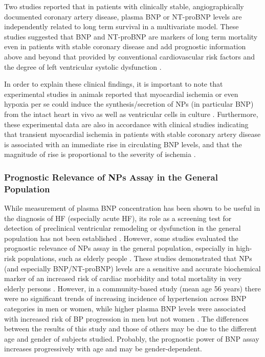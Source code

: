 \documentclass[14pt,a4paper,onecolumn]{extarticle}
\begin{document}
Two  studies reported that in patients with clinically stable, angiographically documented coronary artery disease, plasma BNP \citep{bib3241} or NT-proBNP \citep{bib3242} levels are independently related to long term survival in a multivariate model. These studies suggested that BNP and NT-proBNP are markers of long term mortality even in patients with stable coronary disease and add prognostic information above and beyond that provided by conventional cardiovascular risk factors and the degree of left ventricular systolic dysfunction \citep{bib3241} \citep{bib3242}.



In order to explain these clinical findings, it is important to note that experimental studies in animals reported that myocardial ischemia or even hypoxia per se could induce the synthesis/secretion of NPs (in particular BNP) from the intact heart in vivo as well as ventricular cells in culture \citep{bib3243} \citep{bib3244}. Furthermore, these experimental data are also in accordance with  clinical studies indicating that transient myocardial ischemia in patients with stable coronary artery disease is associated with an immediate rise in circulating BNP levels, and that the magnitude of rise is proportional to the severity of ischemia \citep{bib3163} \citep{bib3164} \citep{bib3246}.





\subsubsection{ Prognostic Relevance of NPs Assay in the General Population}



While measurement of plasma BNP concentration has been shown to be useful in the diagnosis of HF (especially acute HF), its role as a screening test for detection of preclinical ventricular remodeling or dysfunction in the general population has not been established \citep{bib35} \citep{bib3246} \citep{bib3247}. However, some studies evaluated the prognostic relevance of NPs assay in the general population, especially in high-risk populations, such as elderly people \citep{bib316} \citep{bib3187} \citep{bib3224} \citep{bib3244} \citep{bib3245} \citep{bib3246} \citep{bib3247} \citep{bib3248}. These studies demonstrated that NPs (and especially BNP/NT-proBNP) levels are a sensitive and accurate biochemical marker of an increased risk of cardiac morbidity and total mortality in very elderly persons \citep{bib316} \citep{bib3147} \citep{bib3188} \citep{bib3227} \citep{bib3248} \citep{bib3249}. However, in a community-based study (mean age 56 years) there were no significant trends of increasing incidence of hypertension across BNP categories in men or women, while higher plasma BNP levels were associated with increased risk of BP progression in men but not women \citep{bib3250}. The differences between the results of this study \citep{bib3250} and those of others \citep{bib316} \citep{bib3185} \citep{bib3227} \citep{bib3248} \citep{bib3249} may be due to the different age and gender of subjects studied. Probably, the prognostic power of BNP assay increases progressively with age and may be gender-dependent.
\end{document}
